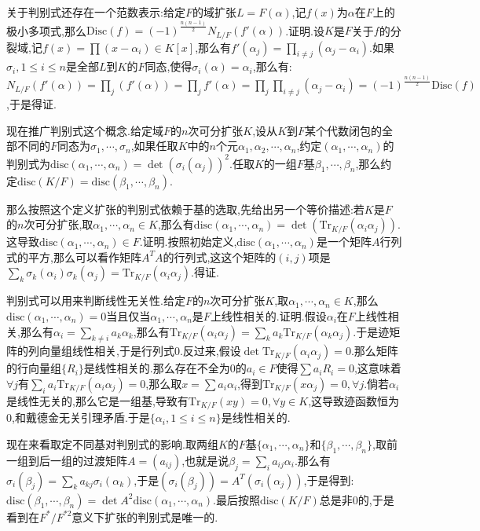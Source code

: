 关于判别式还存在一个范数表示:给定$F$的域扩张$L=F(\alpha)$,记$f(x)$为$\alpha$在$F$上的极小多项式,那么$\mathrm{Disc}(f)=(-1)^{\frac{n(n-1)}{2}}N_{L/F}(f'(\alpha))$.证明.设$K$是$F$关于$f$的分裂域,记$f(x)=\prod(x-\alpha_i)\in K[x]$,那么有$f'(\alpha_j)=\prod_{i\not=j}(\alpha_j-\alpha_i)$.如果$\sigma_i,1\le i\le n$是全部$L$到$K$的$F$同态,使得$\sigma_i(\alpha)=\alpha_i$,那么有:
$N_{L/F}(f'(\alpha))=\prod_j(f'(\alpha))=\prod_jf'(\alpha)
=\prod_j\prod_{i\not=j}(\alpha_j-\alpha_i)=(-1)^{\frac{n(n-1)}{2}}\mathrm{Disc}(f)$,于是得证.

现在推广判别式这个概念.给定域$F$的$n$次可分扩张$K$,设从$K$到$F$某个代数闭包的全部不同的$F$同态为$\sigma_1,\cdots,\sigma_n$,如果任取$K$中的$n$个元$\alpha_1,\alpha_2,\cdots,\alpha_n$,约定$(\alpha_1,\cdots,\alpha_n)$的判别式为$\mathrm{disc}(\alpha_1,\cdots,\alpha_n)=\det (\sigma_i(\alpha_j))^2$.任取$K$的一组$F$基$\beta_1,\cdots,\beta_n$,那么约定$\mathrm{disc}(K/F)=\mathrm{disc}(\beta_1,\cdots,\beta_n)$.

那么按照这个定义扩张的判别式依赖于基的选取,先给出另一个等价描述:若$K$是$F$的$n$次可分扩张,取$\alpha_1,\cdots,\alpha_n\in K$,那么有$\mathrm{disc}(\alpha_1,\cdots,\alpha_n)=\det(\mathrm{Tr} _{K/F}(\alpha_i\alpha_j))$.这导致$\mathrm{disc}(\alpha_1,\cdots,\alpha_n)\in F$.证明.按照初始定义,$\mathrm{disc}(\alpha_1,\cdots,\alpha_n)$是一个矩阵$A$行列式的平方,那么可以看作矩阵$A^TA$的行列式,这这个矩阵的$(i,j)$项是$\sum_k\sigma_k(\alpha_i)\sigma_k(\alpha_j)=\mathrm{Tr} _{K/F}(\alpha_i\alpha_j)$.得证.

判别式可以用来判断线性无关性.给定$F$的$n$次可分扩张$K$,取$\alpha_1,\cdots,\alpha_n\in K$,那么$\mathrm{disc}(\alpha_1,\cdots,\alpha_n)=0$当且仅当$\alpha_1,\cdots,\alpha_n$是$F$上线性相关的.证明.假设$\alpha_i$在$F$上线性相关,那么有$\alpha_i=\sum_ {k\not=i}a_k\alpha_k$,那么有$\mathrm{Tr} _{K/F}(\alpha_i\alpha_j)=\sum_ka_k\mathrm{Tr}_{K/F}(\alpha_k\alpha_j)$.于是迹矩阵的列向量组线性相关,于是行列式0.反过来,假设$\det\mathrm{Tr} _{K/F}(\alpha_i\alpha_j)=0$.那么矩阵的行向量组$\{R_i\}$是线性相关的.那么存在不全为0的$a_i\in F$使得$\sum a_iR_i=0$,这意味着$\forall j$有$\sum_ia_i\mathrm{Tr}_{K/F}(\alpha_i\alpha_j)=0$,那么取$x=\sum a_i\alpha_i$,得到$\mathrm{Tr}_{K/F}(x\alpha_j)=0,\forall j$.倘若$\alpha_i$是线性无关的,那么它是一组基,导致有$\mathrm{Tr} _{K/F}(xy)=0,\forall y\in K$,这导致迹函数恒为0,和戴德金无关引理矛盾.于是$\{\alpha_i,1\le i\le n\}$是线性相关的.

现在来看取定不同基对判别式的影响.取两组$K$的$F$基$\{\alpha_1,\cdots,\alpha_n\}$和$\{\beta_1,\cdots,\beta_n\}$,取前一组到后一组的过渡矩阵$A=(a_{ij})$,也就是说$\beta_j=\sum_ia_ {ij}\alpha_i$.那么有$\sigma_i(\beta_j)=\sum_ka_ {kj}\sigma_i(\alpha_k)$,于是$(\sigma_i(\beta_j))=A^T(\sigma_i(\alpha_j))$,于是得到:$\mathrm{disc}(\beta_1,\cdots,\beta_n)=\det A^2\mathrm{disc}(\alpha_1,\cdots,\alpha_n)$.最后按照$\mathrm{disc}(K/F)$总是非0的,于是看到在$F^*/F^{*2}$意义下扩张的判别式是唯一的.


